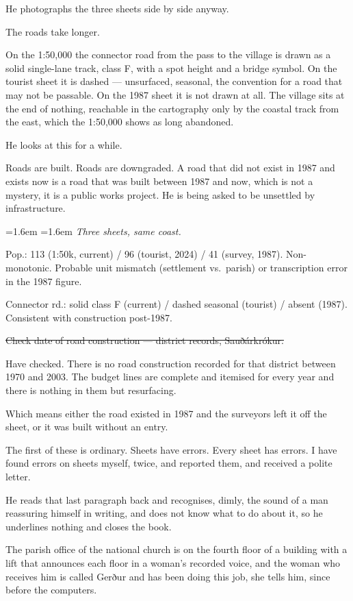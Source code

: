\documentclass[11pt,oneside]{book}
\newcommand{\sceneline}{%
  \par\vspace{1.2em}
  \begin{center}
    \fontsize{11}{11}\selectfont \textbullet\quad\textbullet\quad\textbullet
  \end{center}
  \vspace{0.6em}\noindent\ignorespaces
}
\newenvironment{fieldnote}
  {\par\vspace{0.9em}\begingroup
   \leftskip=1.6em \rightskip=1.6em
   \fontsize{10}{12.4}\selectfont\itshape
   \setlength{\parindent}{0pt}\noindent\ignorespaces}
  {\par\endgroup\vspace{0.9em}\noindent\ignorespaces}
\newcommand{\struck}[1]{\sout{#1}}
\begin{document}
He photographs the three sheets side by side anyway.

The roads take longer.

On the 1:50,000 the connector road from the pass to the village is drawn
as a solid single-lane track, class F, with a spot height and a bridge
symbol. On the tourist sheet it is dashed --- unsurfaced, seasonal, the
convention for a road that may not be passable. On the 1987 sheet it is
not drawn at all. The village sits at the end of nothing, reachable in
the cartography only by the coastal track from the east, which the
1:50,000 shows as long abandoned.

He looks at this for a while.

Roads are built. Roads are downgraded. A road that did not exist in 1987
and exists now is a road that was built between 1987 and now, which is
not a mystery, it is a public works project. He is being asked to be
unsettled by infrastructure.

\begin{fieldnote}
Three sheets, same coast.

Pop.: 113 (1:50k, current) / 96 (tourist, 2024) / 41 (survey, 1987).
Non-monotonic. Probable unit mismatch (settlement vs.\ parish) or
transcription error in the 1987 figure.

Connector rd.: solid class F (current) / dashed seasonal (tourist) /
absent (1987). Consistent with construction post-1987.

\struck{Check date of road construction --- district records, Sauðárkrókur.}

Have checked. There is no road construction recorded for that district
between 1970 and 2003. The budget lines are complete and itemised for
every year and there is nothing in them but resurfacing.

Which means either the road existed in 1987 and the surveyors left it
off the sheet, or it was built without an entry.

The first of these is ordinary. Sheets have errors. Every sheet has
errors. I have found errors on sheets myself, twice, and reported them,
and received a polite letter.
\end{fieldnote}

He reads that last paragraph back and recognises, dimly, the sound of a
man reassuring himself in writing, and does not know what to do about
it, so he underlines nothing and closes the book.

\sceneline

The parish office of the national church is on the fourth floor of a
building with a lift that announces each floor in a woman's recorded
voice, and the woman who receives him is called Gerður and has been
doing this job, she tells him, since before the computers.
\end{document}
